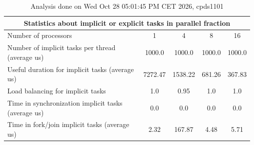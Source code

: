 \begin{table}[h]
\begin{center}
\begin{tabular}{|l|c|c|c|c|}
\hline
\multicolumn{5}{|c|}{Statistics about implicit or explicit tasks in parallel fraction} \\
\hline
\hline
Number of processors & 1 & 4 & 8 & 16 \\
\hline
\hline
Number of implicit tasks per thread (average us)    &          1000.0 &          1000.0 &          1000.0 &          1000.0 \\
\hline
Useful duration for implicit tasks (average us)     &         7272.47 &         1538.22 &          681.26 &          367.83 \\
\hline
Load balancing for implicit tasks                &             1.0 &            0.95 &             1.0 &             1.0 \\
\hline
Time in synchronization implicit tasks (average us) &             0.0 &             0.0 &             0.0 &             0.0 \\
\hline
Time in fork/join implicit tasks (average us)       &            2.32 &          167.87 &            4.48 &            5.71 \\
\hline
\end{tabular}
\end{center}
\caption{ Analysis done on Wed Oct 28 05:01:45 PM CET 2026, cpds1101}
\end{table}
